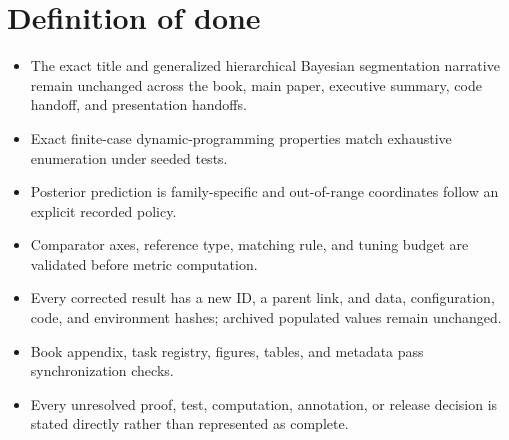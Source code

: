 \section{Definition of done}
\begin{itemize}[leftmargin=1.7em,itemsep=1.5pt,topsep=2pt]
\item The exact title and generalized hierarchical Bayesian segmentation narrative remain unchanged across the book, main paper, executive summary, code handoff, and presentation handoffs.
\item Exact finite-case dynamic-programming properties match exhaustive enumeration under seeded tests.
\item Posterior prediction is family-specific and out-of-range coordinates follow an explicit recorded policy.
\item Comparator axes, reference type, matching rule, and tuning budget are validated before metric computation.
\item Every corrected result has a new ID, a parent link, and data, configuration, code, and environment hashes; archived populated values remain unchanged.
\item Book appendix, task registry, figures, tables, and metadata pass synchronization checks.
\item Every unresolved proof, test, computation, annotation, or release decision is stated directly rather than represented as complete.
\end{itemize}
